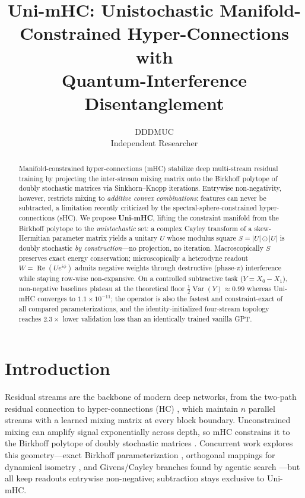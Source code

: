 \documentclass{article}
\begin{document}
\title{Uni-mHC: Unistochastic Manifold-Constrained Hyper-Connections with\\
       Quantum-Interference Disentanglement}

\author{DDDMUC\\
  Independent Researcher}

\maketitle

\begin{abstract}
Manifold-constrained hyper-connections (mHC) stabilize deep multi-stream residual
training by projecting the inter-stream mixing matrix onto the Birkhoff polytope of
doubly stochastic matrices via Sinkhorn--Knopp iterations. Entrywise
non-negativity, however, restricts mixing to \emph{additive convex combinations}:
features can never be subtracted, a limitation recently criticized by the
spectral-sphere-constrained hyper-connections (sHC). We propose \textbf{Uni-mHC},
lifting the constraint manifold from the Birkhoff polytope to the
\emph{unistochastic} set: a complex Cayley transform of a skew-Hermitian parameter
matrix yields a unitary $U$ whose modulus square $S=|U|\odot|U|$ is doubly
stochastic \emph{by construction}---no projection, no iteration. Macroscopically
$S$ preserves exact energy conservation; microscopically a heterodyne readout
$W=\operatorname{Re}(Ue^{i\phi})$ admits negative weights through destructive
(phase-$\pi$) interference while staying row-wise non-expansive.
On a controlled subtractive task ($Y=X_0-X_1$), non-negative baselines plateau at
the theoretical floor $\tfrac12\operatorname{Var}(Y)\approx 0.99$ whereas Uni-mHC
converges to $1.1\times10^{-11}$; the operator is also the fastest and
constraint-exact of all compared parameterizations, and the identity-initialized
four-stream topology reaches $2.3\times$ lower validation loss than an
identically trained vanilla GPT.
\end{abstract}

\section{Introduction}
\label{sec:intro}

Residual streams are the backbone of modern deep networks, from the two-path
residual connection \citep{he2016resnet} to hyper-connections (HC)
\citep{zhu2024hyperconnections}, which maintain $n$ parallel streams with a learned
mixing matrix at every block boundary. Unconstrained mixing can amplify signal
exponentially across depth, so mHC \citep{deepseek2025mhc} constrains it to the
Birkhoff polytope of doubly stochastic matrices \citep{sinkhorn1964,idel2015sinkhorn}.
Concurrent work explores this geometry---exact Birkhoff parameterization
\citep{gomhc2026}, orthogonal mappings for dynamical isometry \citep{jpmhc2026},
and Givens/Cayley branches found by agentic search \citep{cliffsearch2026}---but
all keep readouts entrywise non-negative; subtraction stays exclusive to Uni-mHC.
\end{document}

